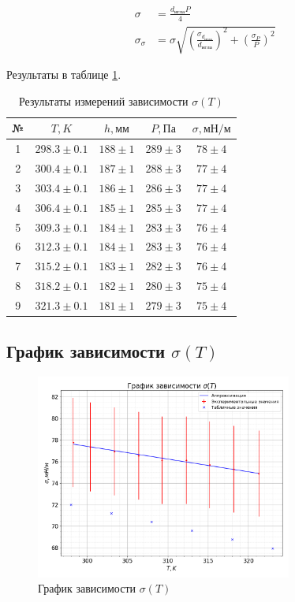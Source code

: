\documentclass[a4paper, 12pt]{article}
\begin{document}
			\begin{align*}
				\sigma &= \frac{d_{игла} P}{4}\\
				\sigma_{\sigma} &= \sigma \sqrt{ \left( \frac{\sigma_{d_{игла}}}{d_{игла}} \right)^2 + \left( \frac{\sigma_P}{P} \right)^2}
			\end{align*}

			Результаты в таблице \ref{tab:sigma_T}.

			\begin{table}[!ht]
				\centering
				\begin{tabular}{|c|c|c|c|c|}
					\hline

					№ & $T, K$ & $h, мм$ & $P, Па$ & $\sigma, мН/м$\\ \hline
					1 & $298.3 \pm 0.1$ & $188 \pm 1$ & $289 \pm 3$ & $78 \pm 4$\\ \hline
					2 & $300.4 \pm 0.1$ & $187 \pm 1$ & $288 \pm 3$ & $77 \pm 4$\\ \hline
					3 & $303.4 \pm 0.1$ & $186 \pm 1$ & $286 \pm 3$ & $77 \pm 4$\\ \hline
					4 & $306.4 \pm 0.1$ & $185 \pm 1$ & $285 \pm 3$ & $77 \pm 4$\\ \hline
					5 & $309.3 \pm 0.1$ & $184 \pm 1$ & $283 \pm 3$ & $76 \pm 4$\\ \hline
					6 & $312.3 \pm 0.1$ & $184 \pm 1$ & $283 \pm 3$ & $76 \pm 4$\\ \hline
					7 & $315.2 \pm 0.1$ & $183 \pm 1$ & $282 \pm 3$ & $76 \pm 4$\\ \hline
					8 & $318.2 \pm 0.1$ & $182 \pm 1$ & $280 \pm 3$ & $75 \pm 4$\\ \hline
					9 & $321.3 \pm 0.1$ & $181 \pm 1$ & $279 \pm 3$ & $75 \pm 4$\\ \hline

				\end{tabular}
				\caption{Результаты измерений зависимости $\sigma(T)$}
				\label{tab:sigma_T}
			\end{table}

		\subsection{График зависимости $\sigma(T)$}

			\begin{figure}[!ht]
				\centering
				\includegraphics[width=0.75\textwidth]{graph/sigma_T_plot.png}
				\caption{График зависимости $\sigma(T)$}
				\label{plot:dsigma_div_dT}
			\end{figure}
\end{document}
